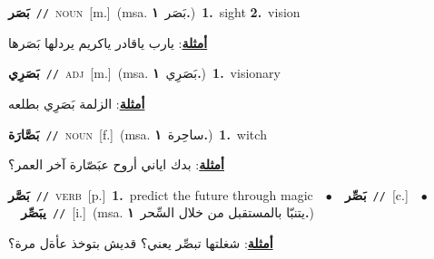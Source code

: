 \documentclass[10pt,a4paper,twoside]{article} %
\begin{document}
\begin{multicols}{2}
{\setlength\topsep{0pt}\textbf{\foreignlanguage{arabic}{بَصَر}}\ {\color{gray}\texttt{//}\color{black}}\ \textsc{noun}\ [m.]\ \color{gray}(msa. \foreignlanguage{arabic}{بَصَر}~\foreignlanguage{arabic}{\textbf{١.}})\color{black}\ \textbf{1.}~sight  \textbf{2.}~vision\  \begin{flushright}\color{gray}\foreignlanguage{arabic}{\textbf{\underline{\foreignlanguage{arabic}{أمثلة}}}: يارب ياقادر ياكريم يردلها بَصَرها}\end{flushright}\color{black}} \vspace{2mm}

{\setlength\topsep{0pt}\textbf{\foreignlanguage{arabic}{بَصَرِي}}\ {\color{gray}\texttt{//}\color{black}}\ \textsc{adj}\ [m.]\ \color{gray}(msa. \foreignlanguage{arabic}{بَصَرِي}~\foreignlanguage{arabic}{\textbf{١.}})\color{black}\ \textbf{1.}~visionary\  \begin{flushright}\color{gray}\foreignlanguage{arabic}{\textbf{\underline{\foreignlanguage{arabic}{أمثلة}}}: الزلمة بَصَرِي بطلعه}\end{flushright}\color{black}} \vspace{2mm}

{\setlength\topsep{0pt}\textbf{\foreignlanguage{arabic}{بَصَّارَة}}\ {\color{gray}\texttt{//}\color{black}}\ \textsc{noun}\ [f.]\ \color{gray}(msa. \foreignlanguage{arabic}{ساحِرة}~\foreignlanguage{arabic}{\textbf{١.}})\color{black}\ \textbf{1.}~witch\  \begin{flushright}\color{gray}\foreignlanguage{arabic}{\textbf{\underline{\foreignlanguage{arabic}{أمثلة}}}: بدك اياني أروح عبَصّارة آخر العمر؟}\end{flushright}\color{black}} \vspace{2mm}

{\setlength\topsep{0pt}\textbf{\foreignlanguage{arabic}{بَصَّر}}\ {\color{gray}\texttt{//}\color{black}}\ \textsc{verb}\ [p.]\ \textbf{1.}~predict the future through magic\ \ $\bullet$\ \ \setlength\topsep{0pt}\textbf{\foreignlanguage{arabic}{بَصِّر}}\ {\color{gray}\texttt{//}\color{black}}\ [c.]\ \ $\bullet$\ \ \setlength\topsep{0pt}\textbf{\foreignlanguage{arabic}{يبَصِّر}}\ {\color{gray}\texttt{//}\color{black}}\ [i.]\ \color{gray}(msa. \foreignlanguage{arabic}{يتنبّا بالمستقبل من خلال السِّحر}~\foreignlanguage{arabic}{\textbf{١.}})\color{black}\  \begin{flushright}\color{gray}\foreignlanguage{arabic}{\textbf{\underline{\foreignlanguage{arabic}{أمثلة}}}: شغلتها تبصِّر يعني؟ قديش بتوخذ عأةل مرة؟}\end{flushright}\color{black}} \vspace{2mm}


\end{multicols}
\end{document}
